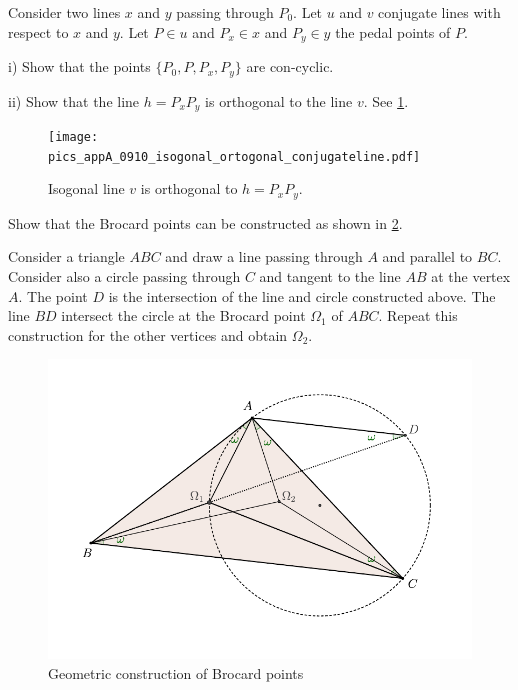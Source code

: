      \begin{exercise}\label{ex:7app}
 Consider two lines $x$ and $y$ passing through $P_0$.
 Let $ u$ and $v$ conjugate lines with respect to $x$ and $y$. Let $P\in u$ and $P_x\in x$ and $P_y\in y$ the pedal points of $P$. 
 
 \noindent i) Show that the points $\{P_0,P,P_x,P_y\} $
 are con-cyclic.
 
 \noindent ii) Show that the line $h=P_xP_y$ is orthogonal to the line $v$. See \cref{fig:isogonal_orthogonal}. 
 
 \begin{figure}[H]
    \centering
   \texttt{[image: pics\_appA\_0910\_isogonal\_ortogonal\_conjugateline.pdf]}
    \caption{ Isogonal line $v$ is orthogonal to  $h=P_xP_y$.
    \label{fig:isogonal_orthogonal}
    }
\end{figure}
 
    \end{exercise}
    
         \begin{exercise}\label{ex:8app}
         Show that the Brocard points can be  constructed as shown in \cref{fig:brocard_construction}.
         
         Consider a triangle $ABC$ and draw a line passing through $A$ and parallel to $BC$. Consider also a circle passing through $C$ and tangent to the line $AB$ at the vertex $A$. The point $D$ is the intersection of the line and circle constructed above.  The line $BD$ intersect the circle at the Brocard point $\Omega_1$ of $ABC$. Repeat this construction for the other vertices and obtain $\Omega_2.$
     
 \begin{figure}[H]
    \centering
   \includegraphics[scale=0.7]{zappA/pics/pics_appA_0930_brocard_points_construcao.pdf}
    \caption{ Geometric construction of Brocard points
    \label{fig:brocard_construction}
    }
\end{figure}
 
    \end{exercise}